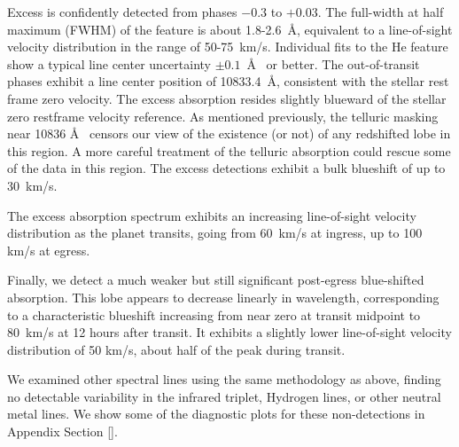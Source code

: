 \documentclass[twocolumn]{aastex631}
\begin{document}
Excess is confidently detected from phases $-$0.3 to $+$0.03.  The full-width at half maximum (FWHM) of the feature is about 1.8-2.6~\AA, equivalent to a line-of-sight velocity distribution in the range of 50-75~km/s.  Individual fits to the He feature show a typical line center uncertainty $\pm0.1$~\AA~ or better.  The out-of-transit phases exhibit a line center position of 10833.4~\AA, consistent with the stellar  rest frame zero velocity.  The excess absorption resides slightly blueward of the stellar zero restframe velocity reference.  As mentioned previously, the telluric masking near 10836 \AA~ censors our view of the existence (or not) of any redshifted lobe in this region.  A more careful treatment of the telluric absorption could rescue some of the data in this region.  The excess detections exhibit a bulk blueshift of up to 30~km/s.

The excess absorption spectrum exhibits an increasing line-of-sight velocity distribution as the planet transits, going from 60~km/s at ingress, up to 100 km/s at egress.

Finally, we detect a much weaker but still significant post-egress blue-shifted absorption.  This lobe appears to decrease linearly in wavelength, corresponding to a characteristic blueshift increasing from near zero at transit midpoint to 80~km/s at 12 hours after transit.  It exhibits a slightly lower line-of-sight velocity distribution of 50 km/s, about half of the peak during transit.

We examined other spectral lines using the same methodology as above, finding no detectable variability in the  infrared triplet, Hydrogen lines, or other neutral metal lines.  We show some of the diagnostic plots for these non-detections in Appendix Section \ref{}.
\end{document}
